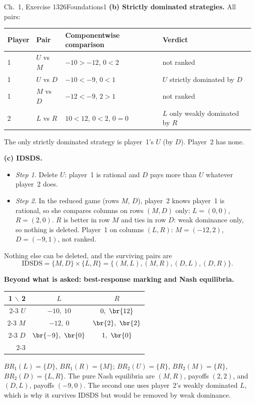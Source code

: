 \begin{exsol}{\MG{} Ch.~1, Exercise 13}{26}{Foundations}{1}
\textbf{(b) Strictly dominated strategies.} All pairs:
\begin{center}\small
\begin{tabular}{llll}
\toprule
Player & Pair & Componentwise comparison & Verdict \\
\midrule
1 & $U$ vs $M$ & $-10 > -12$, $0 < 2$ & not ranked \\
1 & $U$ vs $D$ & $-10 < -9$, $0 < 1$ & $U$ strictly dominated by $D$ \\
1 & $M$ vs $D$ & $-12 < -9$, $2 > 1$ & not ranked \\
2 & $L$ vs $R$ & $10 < 12$, $0 < 2$, $0 = 0$ & $L$ only weakly dominated by $R$ \\
\bottomrule
\end{tabular}
\end{center}
The only strictly dominated strategy is player~1's $U$ (by $D$). Player~2 has none.

\textbf{(c) IDSDS.}
\begin{itemize}
  \item \emph{Step 1.} Delete $U$: player~1 is rational and $D$ pays more than $U$ whatever
  player~2 does.
  \item \emph{Step 2.} In the reduced game (rows $M$, $D$), player~2 knows player~1 is rational,
  so she compares columns on rows $(M, D)$ only: $L = (0, 0)$, $R = (2, 0)$. $R$ is better in row
  $M$ and ties in row $D$: weak dominance only, so nothing is deleted. Player~1 on columns
  $(L, R)$: $M = (-12, 2)$, $D = (-9, 1)$, not ranked.
\end{itemize}
Nothing else can be deleted, and the surviving pairs are
\[
  \text{IDSDS} = \{M, D\} \times \{L, R\} = \{(M,L), (M,R), (D,L), (D,R)\}.
\]

\textbf{Beyond what is asked: best-response marking and Nash equilibria.}
\begin{center}
\begin{tabular}{r|c|c|}
\multicolumn{1}{r}{1 $\backslash$ 2} & \multicolumn{1}{c}{$L$} & \multicolumn{1}{c}{$R$}\\ \cline{2-3}
$U$ & $-10,\ 10$ & $0,\ \br{12}$ \\ \cline{2-3}
$M$ & $-12,\ 0$ & $\br{2},\ \br{2}$ \\ \cline{2-3}
$D$ & $\br{-9},\ \br{0}$ & $1,\ \br{0}$ \\ \cline{2-3}
\end{tabular}
\end{center}
$BR_1(L) = \{D\}$, $BR_1(R) = \{M\}$; $BR_2(U) = \{R\}$, $BR_2(M) = \{R\}$, $BR_2(D) = \{L, R\}$.
The pure Nash equilibria are $(M, R)$, payoffs $(2, 2)$, and $(D, L)$, payoffs $(-9, 0)$. The second
one uses player~2's weakly dominated $L$, which is why it survives IDSDS but would be removed by
weak dominance.


\end{exsol}
